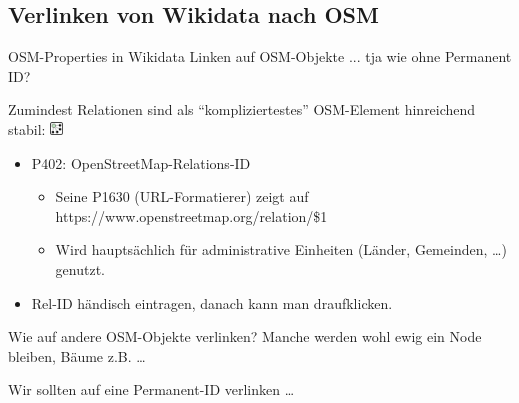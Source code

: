 \documentclass{beamer}
\begin{document}
\subsection{Verlinken von Wikidata nach OSM}

\begin{frame}{OSM-Properties in Wikidata}
  Linken auf OSM-Objekte ... tja wie ohne Permanent ID?

 \vspace*{0.2cm}
 Zumindest Relationen sind als "`kompliziertestes"' OSM-Element hinreichend stabil: \includegraphics[height=3.5mm]{relation.png}

\begin{itemize}
  \item P402: OpenStreetMap-Relations-ID
  \begin{itemize}
    \item Seine P1630 (URL-Formatierer) zeigt auf https://www.openstreetmap.org/relation/\$1
    \item Wird hauptsächlich für administrative Einheiten (Länder, Gemeinden, \dots) genutzt.
  \end{itemize}

  \pause
  \item Rel-ID händisch eintragen, danach kann man draufklicken.

\end{itemize}



Wie auf andere OSM-Objekte verlinken? Manche werden wohl ewig ein Node bleiben, Bäume z.B. \dots

Wir sollten auf eine Permanent-ID verlinken \dots 


\end{frame}
\end{document}
